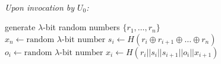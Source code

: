 \documentclass[USenglish,oneside,twocolumn]{article}
\begin{document}
\begin{figure}
    \centering
    \begin{framed}
        \small
        \begin{minipage}{0.45\textwidth}
            \begin{algorithmic}
                \\
                \emph{Upon invocation by $U_0$:}

                \State generate $\lambda$-bit random numbers $\{ r_1,\dots,r_n \}$
                \State $x_n \gets \text{random \(\lambda\)-bit number}$
                \State $s_i \gets H(r_i\oplus r_{i+1}\oplus\dots\oplus r_n)$
                \State $o_i \gets \text{random \(\lambda\)-bit number}$
                \State $x_i \gets H(r_i||s_i||s_{i+1}||o_i||x_{i+1})$
                \EndIf
                \EndFor


\end{algorithmic}
\end{minipage}
\end{framed}
\end{figure}
\end{document}
